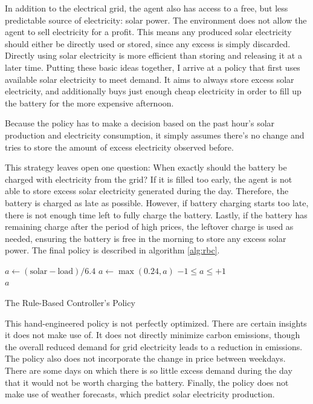 In addition to the electrical grid, the agent also has access to a free, but less predictable source of electricity: solar power.
The environment does not allow the agent to sell electricity for a profit.
This means any produced solar electricity should either be directly used or stored, since any excess is simply discarded.
Directly using solar electricity is more efficient than storing and releasing it at a later time.
Putting these basic ideas together, I arrive at a policy that first uses available solar electricity to meet demand.
It aims to always store excess solar electricity, and additionally buys just enough cheap electricity in order to fill up the battery for the more expensive afternoon.

Because the policy has to make a decision based on the past hour's solar production and electricity consumption, it simply assumes there's no change and tries to store the amount of excess electricity observed before.

This strategy leaves open one question:
When exactly should the battery be charged with electricity from the grid?
If it is filled too early, the agent is not able to store excess solar electricity generated during the day.
Therefore, the battery is charged as late as possible.
However, if battery charging starts too late, there is not enough time left to fully charge the battery. 
Lastly, if the battery has remaining charge after the period of high prices, the leftover charge is used as needed, ensuring the battery is free in the morning to store any excess solar power.
The final policy is described in algorithm \ref{alg:rbc}.

\begin{algorithm}[h]
    \begin{algorithmic}
        \State $a \gets (\text{solar} - \text{load})/6.4$ 
            \State $a \gets \max(0.24, a)$ 
        \EndIf
        \Ensure $-1 \leq a \leq +1$ \\
        \Return $a$
    \end{algorithmic}
    \caption{The Rule-Based Controller's Policy}
    \label{alg:rbc}
\end{algorithm}

This hand-engineered policy is not perfectly optimized.
There are certain insights it does not make use of.
It does not directly minimize carbon emissions, though the overall reduced demand for grid electricity leads to a reduction in emissions.
The policy also does not incorporate the change in price between weekdays.
There are some days on which there is so little excess demand during the day that it would not be worth charging the battery.
Finally, the policy does not make use of weather forecasts, which predict solar electricity production.

